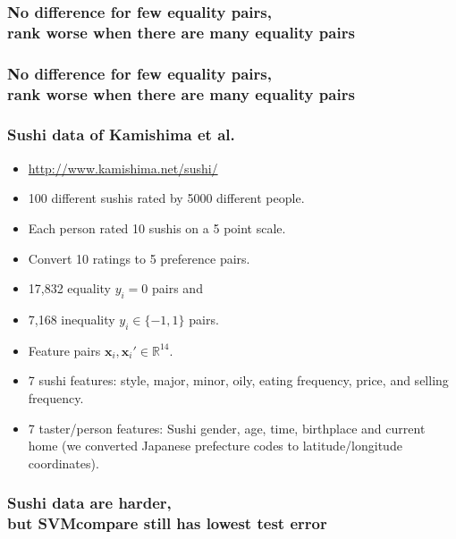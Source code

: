 \documentclass{beamer}
\newcommand{\RR}{\mathbb R}
\begin{document}


\begin{frame}
  \frametitle{No difference for few equality pairs,\\
    rank worse when there are many equality pairs}
  \begin{minipage}{1.0\linewidth}
    \hskip -0.5cm
      
  \end{minipage}
\end{frame}

\begin{frame}
  \frametitle{No difference for few equality pairs,\\
    rank worse when there are many equality pairs}
  \begin{minipage}{1.0\linewidth}
    \hskip -0.5cm
      
  \end{minipage}
\end{frame}

\begin{frame}
  \frametitle{Sushi data of Kamishima et al.}
  \begin{itemize}
  \item  \url{http://www.kamishima.net/sushi/}
  \item 100 different sushis rated by 5000 different people.
  \item Each person rated 10 sushis on a 5 point scale. 
  \item Convert 10 ratings to 5 preference pairs.
  \item 17,832 equality $y_i=0$ pairs and
  \item 7,168 inequality $y_i\in\{-1,1\}$ pairs.
  \item Feature pairs $\mathbf x_i,\mathbf x_i'\in\RR^{14}$.
  \item 7 sushi features: style, major, minor, oily, eating frequency,
    price, and selling frequency.
  \item 7 taster/person features: Sushi gender, age, time, birthplace
    and current home (we converted Japanese prefecture codes to
    latitude/longitude coordinates).
  \end{itemize}
\end{frame}

\begin{frame}
  \frametitle{Sushi data are harder,\\
    but SVMcompare still has lowest test error}
  \begin{minipage}{1.0\linewidth}
    \hskip -1cm
      
  \end{minipage}
\end{frame}
\end{document}
